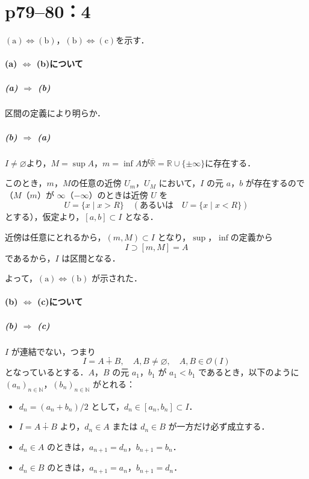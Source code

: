 \section*{p79--80：4} \label{p79--80：4}
\begin{tproof}
    $(\text{a}) \iff (\text{b})$，$(\text{b}) \iff (\text{c})$を示す．

    \paragraph{(a) $\iff$ (b)について}

    \subparagraph{(a) $\Longrightarrow$ (b)}
    区間の定義により明らか．

    \subparagraph{(b) $\Longrightarrow$ (a)}
    $I \ne \varnothing$より，$M = \sup A$，$m = \inf A$が$\overline{\mathbb{R}}= \mathbb{R} \cup \{ \pm \infty \}$に存在する．

    このとき，$m$，$M$の任意の近傍 $U_m$，$U_M$ において，$I$ の元 $a$，$b$ が存在するので
    （$M$（$m$）が $\infty$（$-\infty$）のときは近傍 $U$ を
    \[
        U = \{ x \mid x > R\}\quad (\text{あるいは}\quad U = \{ x \mid x < R\})
    \]
    とする），仮定より，$[a,b] \subset I$ となる．

    近傍は任意にとれるから，$(m,M) \subset I$ となり，$\sup$，$\inf$の定義から
    \[
        I \supset [m,M] = A
    \]
    であるから，$I$ は区間となる．

    よって，$(\text{a}) \iff (\text{b})$ が示された．

    \paragraph{(b) $\iff$ (c)について}

    \subparagraph{(b) $\Longrightarrow$ (c)}
    $I$ が連結でない，つまり
    \[
        I = A \dotplus B,\quad A,B \ne \varnothing,\quad A , B \in \mathcal{O} (I)
    \]
    となっているとする．$A$，$B$ の元 $a_1$，$b_1$ が $a_1 < b_1$ であるとき，以下のように
    $(a_n)_{n \in \mathbb{N}}$，$(b_n)_{n \in \mathbb{N}}$ がとれる：

    \begin{itemize}
        \item $d_n = (a_n + b_n)/2$ として，$d_n \in [a_n,b_n] \subset I$．
        \item $I= A \dotplus B$ より，$d_n \in A$ または $d_n \in B$ が一方だけ必ず成立する．
        \item $d_n \in A$ のときは，$a_{n+1} = d_n$，$b_{n+1} = b_n$．
        \item $d_n \in B$ のときは，$a_{n+1} = a_n$，$b_{n+1} = d_n$．
    \end{itemize}


\end{tproof}

